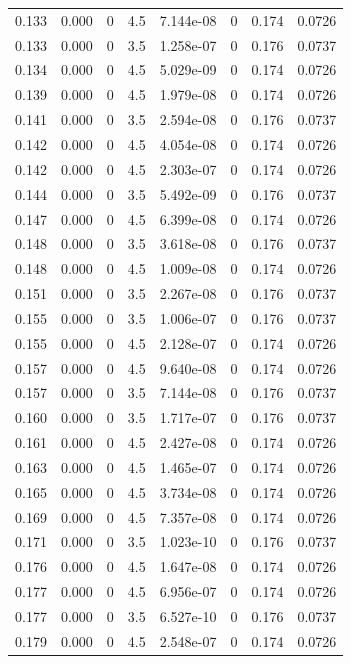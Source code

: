 \documentclass[preview]{standalone}
\begin{document}
{{{\begin{tabular}{L{1.2cm}C{1.2cm} C{0.3cm}C{0.5cm} C{1.4cm}C{1.4cm} C{1.4cm}C{1.4cm}}
  0.133  &  0.000  & 0     & 4.5 &  7.144e-08  & 0  & 0.174 &  0.0726   \\ 
  0.133  &  0.000  & 0     & 3.5 &  1.258e-07  & 0  & 0.176 &  0.0737   \\ 
  0.134  &  0.000  & 0     & 4.5 &  5.029e-09  & 0  & 0.174 &  0.0726   \\ 
  0.139  &  0.000  & 0     & 4.5 &  1.979e-08  & 0  & 0.174 &  0.0726   \\ 
  0.141  &  0.000  & 0     & 3.5 &  2.594e-08  & 0  & 0.176 &  0.0737   \\ 
  0.142  &  0.000  & 0     & 4.5 &  4.054e-08  & 0  & 0.174 &  0.0726   \\ 
  0.142  &  0.000  & 0     & 4.5 &  2.303e-07  & 0  & 0.174 &  0.0726   \\ 
  0.144  &  0.000  & 0     & 3.5 &  5.492e-09  & 0  & 0.176 &  0.0737   \\ 
  0.147  &  0.000  & 0     & 4.5 &  6.399e-08  & 0  & 0.174 &  0.0726   \\ 
  0.148  &  0.000  & 0     & 3.5 &  3.618e-08  & 0  & 0.176 &  0.0737   \\ 
  0.148  &  0.000  & 0     & 4.5 &  1.009e-08  & 0  & 0.174 &  0.0726   \\ 
  0.151  &  0.000  & 0     & 3.5 &  2.267e-08  & 0  & 0.176 &  0.0737   \\ 
  0.155  &  0.000  & 0     & 3.5 &  1.006e-07  & 0  & 0.176 &  0.0737   \\ 
  0.155  &  0.000  & 0     & 4.5 &  2.128e-07  & 0  & 0.174 &  0.0726   \\ 
  0.157  &  0.000  & 0     & 4.5 &  9.640e-08  & 0  & 0.174 &  0.0726   \\ 
  0.157  &  0.000  & 0     & 3.5 &  7.144e-08  & 0  & 0.176 &  0.0737   \\ 
  0.160  &  0.000  & 0     & 3.5 &  1.717e-07  & 0  & 0.176 &  0.0737   \\ 
  0.161  &  0.000  & 0     & 4.5 &  2.427e-08  & 0  & 0.174 &  0.0726   \\ 
  0.163  &  0.000  & 0     & 4.5 &  1.465e-07  & 0  & 0.174 &  0.0726   \\ 
  0.165  &  0.000  & 0     & 4.5 &  3.734e-08  & 0  & 0.174 &  0.0726   \\ 
  0.169  &  0.000  & 0     & 4.5 &  7.357e-08  & 0  & 0.174 &  0.0726   \\ 
  0.171  &  0.000  & 0     & 3.5 &  1.023e-10  & 0  & 0.176 &  0.0737   \\ 
  0.176  &  0.000  & 0     & 4.5 &  1.647e-08  & 0  & 0.174 &  0.0726   \\ 
  0.177  &  0.000  & 0     & 4.5 &  6.956e-07  & 0  & 0.174 &  0.0726   \\ 
  0.177  &  0.000  & 0     & 3.5 &  6.527e-10  & 0  & 0.176 &  0.0737   \\ 
  0.179  &  0.000  & 0     & 4.5 &  2.548e-07  & 0  & 0.174 &  0.0726   \\ 
\hline 
\end{tabular} 

}}}
\end{document}
